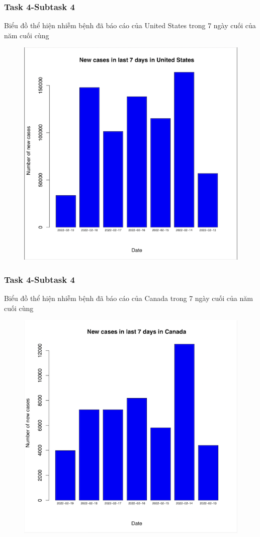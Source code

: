 \documentclass[english,10pt,table]{beamer}
\begin{document}
\frame
{
    \frametitle{Task 4-Subtask 4}
    \begin{block}{Biểu đồ thể hiện nhiễm bệnh đã báo cáo của United States trong 7 ngày cuối của năm cuối cùng}
    \begin{figure}[H]
		\centering
		\includegraphics[scale=0.6]{images/4.4.1.png}
	\end{figure}
    \end{block}
}
{
    \frametitle{Task 4-Subtask 4}
    \begin{block}{Biểu đồ thể hiện nhiễm bệnh đã báo cáo của Canada trong 7 ngày cuối của năm cuối cùng}
    \begin{figure}[H]
		\centering
		\includegraphics[scale=0.6]{images/4.4.2.png}
	\end{figure}
    \end{block}
}
\end{document}
